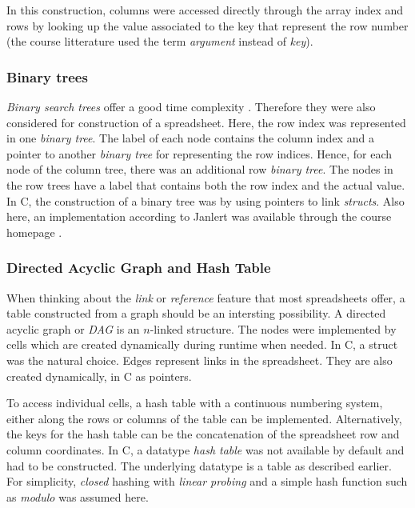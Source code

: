 \documentclass[a4paper,11pt,twoside]{article}
\begin{document}
In this construction, columns were accessed directly through the array
index and rows by looking up the value associated to the key that
represent the row number (the course litterature used the term
\textit{argument} instead of \textit{key}\cite{janlert2000}).
 

\subsubsection{Binary trees}
\textit{Binary search trees} offer a good time complexity
\cite[pp. 286-291]{janlert2000}. Therefore they were also considered
for construction of a spreadsheet. Here, the row index was represented
in one \textit{binary tree}. The label of each node contains the
column index and a pointer to another \textit{binary tree} for
representing the row indices. Hence, for each node of the column tree,
there was an additional row \textit{binary tree}. The nodes in the row
trees have a label that contains both the row index and the actual value. 
In C, the construction of a binary tree was by using pointers to link
\textit{structs}. Also here, an implementation according to Janlert
\cite{janlert2000} was available through the course homepage
\cite{datatypes}. 

\subsubsection{Directed Acyclic Graph and Hash Table}
When thinking about the \emph{link} or \emph{reference} feature that most
spreadsheets offer, a table constructed from a graph
should be an intersting possibility.  A directed acyclic graph or
\textit{DAG} is an $n$-linked structure. The nodes were implemented by
cells which are created dynamically during runtime when needed. In C, a 
struct was the natural choice. Edges represent links in the
spreadsheet. They are also created dynamically, in C as pointers. 

To access individual cells, a hash table with a continuous numbering
system, either along the rows or columns of the table can be
implemented. Alternatively, the keys for the hash table can be the
concatenation of the spreadsheet row and column coordinates. In C, a
datatype \textit{hash table} was not available by default and had to be
constructed. The underlying datatype is a table as described
earlier. For simplicity, \emph{closed} hashing with \emph{linear
 probing} and a simple hash function such as \textit{modulo} was
assumed here\cite[p. 277]{janlert2000}. 
\end{document}
